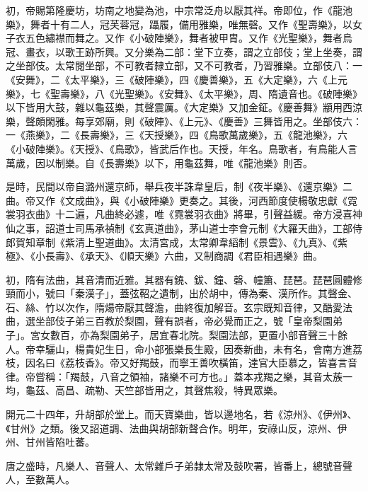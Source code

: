 \begin{pinyinscope}
 初，帝賜第隆慶坊，坊南之地變為池，中宗常泛舟以厭其祥。帝即位，作《龍池樂》，舞者十有二人，冠芙蓉冠，躡履，備用雅樂，唯無磬。又作《聖壽樂》，以女子衣五色繡襟而舞之。又作《小破陣樂》，舞者被甲胄。又作《光聖樂》，舞者烏冠、畫衣，以歌王跡所興。又分樂為二部：堂下立奏，謂之立部伎；堂上坐奏，謂之坐部伎。太常閱坐部，不可教者隸立部，又不可教者，乃習雅樂。立部伎八：一《安舞》，二《太平樂》，三《破陣樂》，四《慶善樂》，五《大定樂》，六《上元樂》，七《聖壽樂》，八《光聖樂》。《安舞》、《太平樂》，周、隋遺音也。《破陣樂》以下皆用大鼓，雜以龜茲樂，其聲震厲。《大定樂》又加金鉦。《慶善舞》顓用西涼樂，聲頗閑雅。每享郊廟，則《破陣》、《上元》、《慶善》三舞皆用之。坐部伎六：一《燕樂》，二《長壽樂》，三《天授樂》，四《鳥歌萬歲樂》，五《龍池樂》，六《小破陣樂》。《天授》、《鳥歌》，皆武后作也。天授，年名。鳥歌者，有鳥能人言萬歲，因以制樂。自《長壽樂》以下，用龜茲舞，唯《龍池樂》則否。



 是時，民間以帝自潞州還京師，舉兵夜半誅韋皇后，制《夜半樂》、《還京樂》二曲。帝又作《文成曲》，與《小破陣樂》更奏之。其後，河西節度使楊敬忠獻《霓裳羽衣曲》十二遍，凡曲終必遽，唯《霓裳羽衣曲》將畢，引聲益緩。帝方浸喜神仙之事，詔道士司馬承禎制《玄真道曲》，茅山道士李會元制《大羅天曲》，工部侍郎賀知章制《紫清上聖道曲》。太清宮成，太常卿韋縚制《景雲》、《九真》、《紫極》、《小長壽》、《承天》、《順天樂》六曲，又制商調《君臣相遇樂》曲。



 初，隋有法曲，其音清而近雅。其器有鐃、鈸、鐘、磬、幢簫、琵琶。琵琶圓體修頸而小，號曰「秦漢子」，蓋弦鞀之遺制，出於胡中，傳為秦、漢所作。其聲金、石、絲、竹以次作，隋煬帝厭其聲澹，曲終復加解音。玄宗既知音律，又酷愛法曲，選坐部伎子弟三百教於梨園，聲有誤者，帝必覺而正之，號「皇帝梨園弟子」。宮女數百，亦為梨園弟子，居宜春北院。梨園法部，更置小部音聲三十餘人。帝幸驪山，楊貴妃生日，命小部張樂長生殿，因奏新曲，未有名，會南方進荔枝，因名曰《荔枝香》。帝又好羯鼓，而寧王善吹橫笛，達官大臣慕之，皆喜言音律。帝嘗稱：「羯鼓，八音之領袖，諸樂不可方也。」蓋本戎羯之樂，其音太蔟一均，龜茲、高昌、疏勒、天竺部皆用之，其聲焦殺，特異眾樂。



 開元二十四年，升胡部於堂上。而天寶樂曲，皆以邊地名，若《涼州》、《伊州》、《甘州》之類。後又詔道調、法曲與胡部新聲合作。明年，安祿山反，涼州、伊州、甘州皆陷吐蕃。



 唐之盛時，凡樂人、音聲人、太常雜戶子弟隸太常及鼓吹署，皆番上，總號音聲人，至數萬人。




\end{pinyinscope}
